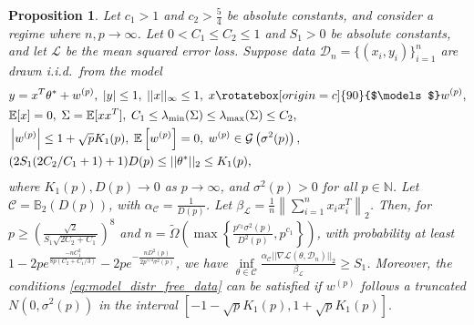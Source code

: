 \documentclass{article}
\newtheorem{prop}{Proposition}
\newcommand{\indep}{\rotatebox[origin=c]{90}{$\models$}}
\newcommand{\iid}{i.i.d.{\ }}
\begin{document}
\begin{prop}
\label{prop:achievab_UP_ERM}
Let $c_1 > 1$ and $c_2 > \frac{5}{4}$ be absolute constants, and consider a regime where $n, p \rightarrow \infty$. Let $0 < C_1 \leq C_2 \leq 1$ and $S_1 > 0$ be absolute constants, and let $\mathcal{L}$ be the mean squared error loss. Suppose data $\mathcal{D}_n = \{(x_i, y_i)\}_{i = 1}^n$ are drawn \iid from the model
\begin{align}
\label{eq:model_distr_free_data}
&y = x^T\theta^* + w^{(p)}, \; |y| \leq 1, \; ||x||_{\infty} \leq 1, \; x \indep w^{(p)}, \notag\\
&\mathbb{E}[x] = 0, \; \Sigma = \mathbb{E}[xx^T], \; C_1 \leq \lambda_{\min}(\Sigma) \leq \lambda_{\max}(\Sigma) \leq C_2, \notag\\
&\left|w^{(p)}\right| \leq 1 + \sqrt{p}K_1(p), \; \mathbb{E}\left[w^{(p)}\right] = 0, \; w^{(p)} \in \mathcal{G}\left(\sigma^2(p)\right), \notag\\
&(2S_1(2C_2/C_1 + 1) + 1)D(p) \leq ||\theta^*||_2 \leq K_1(p),
\end{align}
where $K_1(p), D(p) \rightarrow 0$ as $p \rightarrow \infty$, and $\sigma^2(p) > 0$ for all $p \in \mathbb{N}$. Let $\mathcal{C} = \mathbb{B}_2\left(D(p)\right)$, with $\alpha_{\mathcal{C}} = \frac{1}{D(p)}$. Let $\beta_{\mathcal{L}} = \frac{1}{n}\left\|\sum_{i = 1}^nx_ix_i^T\right\|_2$. Then, for $p \geq \left(\frac{\sqrt{2}}{S_1\sqrt{2C_2 + C_1}}\right)^8$ and $n = \widetilde{\Omega}\left(\max\left\{\frac{p^{c_2}\sigma^2(p)}{D^2(p)}, p^{c_1}\right\}\right)$, with probability at least $1 - 2pe^{\frac{-nC_1^2}{8p\left(C_2+ C_1/3\right)}} - 2pe^{-\frac{nD^2(p)}{2p^{5/4}\sigma^2(p)}}$, we have
$\mathop{\inf}\limits_{\theta \in \mathcal{C}}\frac{\alpha_{\mathcal{C}}||\nabla \mathcal{L}(\theta, \mathcal{D}_n)||_2}{\beta_{\mathcal{L}}} \geq S_1$. Moreover, the conditions \eqref{eq:model_distr_free_data} can be satisfied if $w^{(p)}$ follows a truncated $N(0, \sigma^2(p))$ in the interval $[-1 - \sqrt{p}K_1(p), 1 + \sqrt{p}K_1(p)]$.
\end{prop}
\end{document}
